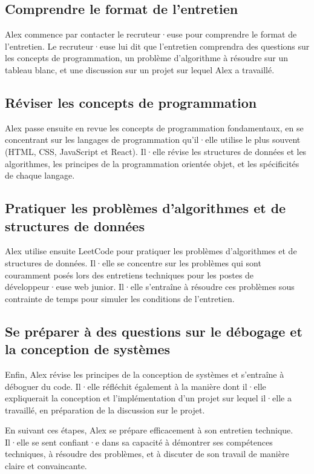 \subsection{Comprendre le format de l'entretien}

Alex commence par contacter le recruteur·euse pour comprendre le format de l'entretien. Le recruteur·euse lui dit que l'entretien comprendra des questions sur les concepts de programmation, un problème d'algorithme à résoudre sur un tableau blanc, et une discussion sur un projet sur lequel Alex a travaillé.

\subsection{Réviser les concepts de programmation}

Alex passe ensuite en revue les concepts de programmation fondamentaux, en se concentrant sur les langages de programmation qu'il·elle utilise le plus souvent (HTML, CSS, JavaScript et React). Il·elle révise les structures de données et les algorithmes, les principes de la programmation orientée objet, et les spécificités de chaque langage.

\subsection{Pratiquer les problèmes d'algorithmes et de structures de données}

Alex utilise ensuite LeetCode pour pratiquer les problèmes d'algorithmes et de structures de données. Il·elle se concentre sur les problèmes qui sont couramment posés lors des entretiens techniques pour les postes de développeur·euse web junior. Il·elle s'entraîne à résoudre ces problèmes sous contrainte de temps pour simuler les conditions de l'entretien.

\subsection{Se préparer à des questions sur le débogage et la conception de systèmes}

Enfin, Alex révise les principes de la conception de systèmes et s'entraîne à déboguer du code. Il·elle réfléchit également à la manière dont il·elle expliquerait la conception et l'implémentation d'un projet sur lequel il·elle a travaillé, en préparation de la discussion sur le projet.

En suivant ces étapes, Alex se prépare efficacement à son entretien technique. Il·elle se sent confiant·e dans sa capacité à démontrer ses compétences techniques, à résoudre des problèmes, et à discuter de son travail de manière claire et convaincante.

